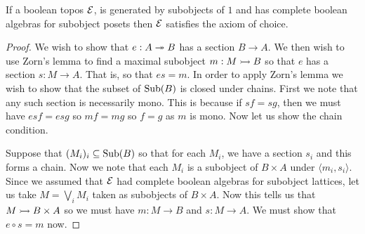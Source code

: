 \begin{lem}\label{lem:background:completealgebratoaoc}
  If a boolean topos $\mathcal{E}{}$, is generated by subobjects of $1$ and
  has complete boolean algebras for subobject posets then $\mathcal{E}{}$
  satisfies the axiom of choice.
\end{lem}
\begin{proof}
  We wish to show that $e : A \twoheadrightarrow B$ has a section $B \to A$. We then
  wish to use Zorn's lemma to find a maximal subobject $m : M \rightarrowtail B$
  so that $e$ has a section $s : M \to A$. That is, so that $es = m$.
  In order to apply Zorn's lemma we wish to show that the subset of
  $\operatorname{Sub}(B)$ is closed under chains. First we note that any such
  section is necessarily mono. This is because if $sf = sg$, then we
  must have $esf = esg$ so $mf = mg$ so $f = g$ as $m$ is mono. Now
  let us show the chain condition.

  Suppose that $(M_i)_i \subseteq \operatorname{Sub}(B)$ so that for each $M_i$, we
  have a section $s_i$ and this forms a chain. Now we note that each
  $M_i$ is a subobject of $B \times A$ under
  $\langle m_i, s_i \rangle$. Since we assumed that $\mathcal{E}{}$ had
  complete boolean algebras for subobject lattices, let us take
  $M = \bigvee_i M_i$ taken as subobjects of $B \times A$. Now this
  tells us that $M \rightarrowtail B \times A$ so we must have $m : M \to B$ and
  $s : M \to A$. We must show that $e \circ s = m$ now.


\end{proof}
